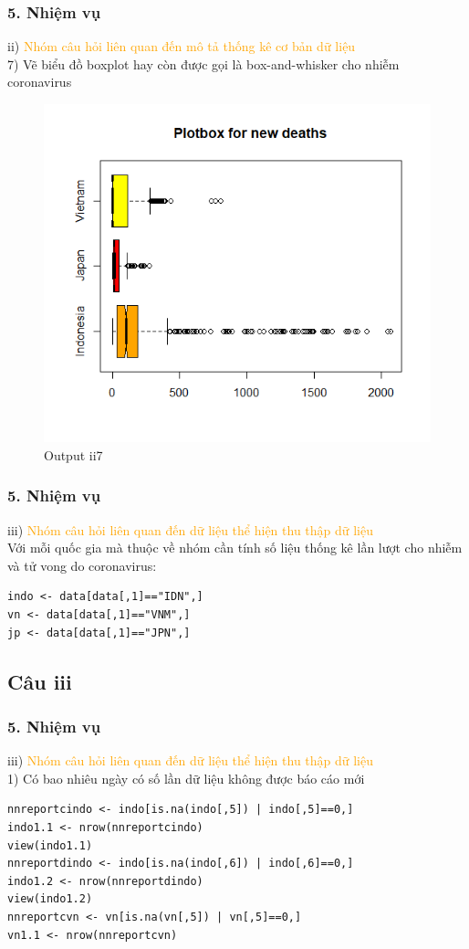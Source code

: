 \documentclass[english,10pt,table]{beamer}
\begin{document}
\begin{frame}[fragile]
\frametitle{5.  Nhiệm vụ}
	ii) \textcolor{orange}{Nhóm câu hỏi liên quan đến mô tả thống kê cơ bản dữ liệu}\\
	7) Vẽ biểu đồ boxplot hay còn được gọi là box-and-whisker cho nhiễm coronavirus
	\begin{figure}[h!]
	\begin{center}
		    \includegraphics[scale = 0.4]{Images/II/ii7death.png}
		     \caption{Output ii7}
		\end{center}
		\end{figure}
\end{frame}

\begin{frame}[fragile]
\frametitle{5.  Nhiệm vụ}
	iii) \textcolor{orange}{Nhóm câu hỏi liên quan đến dữ liệu thể hiện thu thập dữ liệu}\\
Với mỗi quốc gia mà thuộc về nhóm cần tính số liệu thống kê lần lượt cho nhiễm và tử vong do coronavirus:
\begin{lstlisting}[frame=single]  
indo <- data[data[,1]=="IDN",]
vn <- data[data[,1]=="VNM",]
jp <- data[data[,1]=="JPN",]
	\end{lstlisting}
\end{frame}
\subsection{Câu iii}
\begin{frame}[fragile]
\frametitle{5.  Nhiệm vụ}
	iii) \textcolor{orange}{Nhóm câu hỏi liên quan đến dữ liệu thể hiện thu thập dữ liệu}\\%
    1) Có bao nhiêu ngày có số lần dữ liệu không được báo cáo mới
 \begin{lstlisting}[frame=single]  
nnreportcindo <- indo[is.na(indo[,5]) | indo[,5]==0,]
indo1.1 <- nrow(nnreportcindo)
view(indo1.1)
nnreportdindo <- indo[is.na(indo[,6]) | indo[,6]==0,]
indo1.2 <- nrow(nnreportdindo)
view(indo1.2)
nnreportcvn <- vn[is.na(vn[,5]) | vn[,5]==0,]
vn1.1 <- nrow(nnreportcvn)
	\end{lstlisting}
\end{frame}
\end{document}
